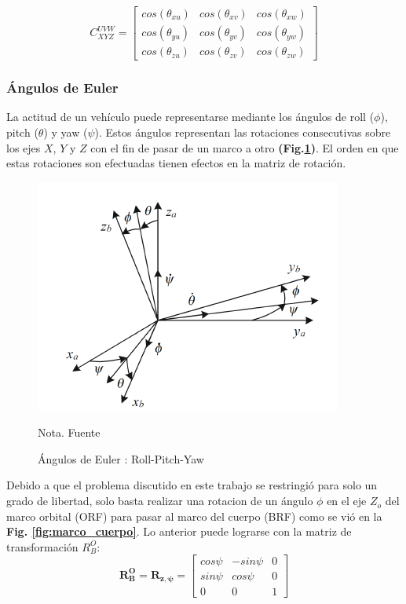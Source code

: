 $$
C_{XYZ}^{UVW} = \left[\begin{array}{ccc}
	cos\left(\theta_{xu}\right) &cos\left(\theta_{xv}\right) & cos\left(\theta_{xw}\right)\\
	cos\left(\theta_{yu}\right) &cos\left(\theta_{yv}\right) & cos\left(\theta_{yw}\right)\\
	cos\left(\theta_{zu}\right) &cos\left(\theta_{zv}\right) & cos\left(\theta_{zw}\right)
\end{array}\right]
$$
	

\subsubsection{Ángulos de Euler}
\hfill \break
La actitud de un vehículo puede representarse mediante los ángulos de roll ($\phi$), pitch ($\theta$) y yaw ($\psi$). Estos ángulos representan las rotaciones consecutivas sobre los ejes $X$, $Y$ y $Z$ con el fin de pasar de un marco a otro \textbf{(Fig.\ref{fig:angulosEuler})}. El orden en que estas rotaciones son efectuadas tienen efectos en la matriz de rotación.



\begin{figure}[!ht]
	\begin{center}
		\includegraphics[scale=0.8]{imagenes/marco_teorico/angulos_euler.PNG}\\
	\end{center}
	\caption{ Ángulos de Euler : Roll-Pitch-Yaw }
	\label{fig:angulosEuler}
	\footnotesize{Nota. Fuente \cite{tes:Sorolla2019}}
\end{figure}

 Debido a que el problema discutido en este trabajo se restringió para solo un grado de libertad, solo basta realizar una rotacion de un ángulo $\phi$ en el eje $Z_o$ del marco orbital (ORF) para pasar al marco del cuerpo (BRF) como se vió en la  \textbf{Fig. \ref{fig:marco_cuerpo}}. Lo anterior puede lograrse con la matriz de transformación $R_{B}^{O}$:
$$
\mathbf{R_{B}^{O}}=\mathbf{R_{z,\psi}}=\left[\begin{array}{ccc}
	cos\psi & -sin\psi & 0 \\
	sin\psi & cos\psi & 0 \\
	0 & 0 & 1
\end{array}\right]
$$


